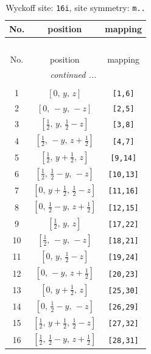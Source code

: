 \documentclass[fleqn,8pt]{jsarticle}
\begin{document}
\renewcommand{\arraystretch}{1.2}
\begin{longtable}{ccc}
\caption{Wyckoff site: {\tt 16i}, site symmetry: {\tt m..}}
 \\
 \hline \hline
No. & position & mapping \\ \hline \endfirsthead

\multicolumn{2}{l}{\tablename\ \thetable{}} \\
 \hline \hline
No. & position & mapping \\ \hline \endhead

 \hline \hline
\multicolumn{2}{r}{\footnotesize\it continued ...} \\ \endfoot

 \hline \hline
\multicolumn{2}{r}{} \\ \endlastfoot

1 & $\left[ 0,\, y,\, z \right]$ & {\tt [1,6]} \\ \hline
2 & $\left[ 0,\, - y,\, - z \right]$ & {\tt [2,5]} \\ \hline
3 & $\left[ \frac{1}{2},\, y,\, \frac{1}{2} - z \right]$ & {\tt [3,8]} \\ \hline
4 & $\left[ \frac{1}{2},\, - y,\, z + \frac{1}{2} \right]$ & {\tt [4,7]} \\ \hline
5 & $\left[ \frac{1}{2},\, y + \frac{1}{2},\, z \right]$ & {\tt [9,14]} \\ \hline
6 & $\left[ \frac{1}{2},\, \frac{1}{2} - y,\, - z \right]$ & {\tt [10,13]} \\ \hline
7 & $\left[ 0,\, y + \frac{1}{2},\, \frac{1}{2} - z \right]$ & {\tt [11,16]} \\ \hline
8 & $\left[ 0,\, \frac{1}{2} - y,\, z + \frac{1}{2} \right]$ & {\tt [12,15]} \\ \hline
9 & $\left[ \frac{1}{2},\, y,\, z \right]$ & {\tt [17,22]} \\ \hline
10 & $\left[ \frac{1}{2},\, - y,\, - z \right]$ & {\tt [18,21]} \\ \hline
11 & $\left[ 0,\, y,\, \frac{1}{2} - z \right]$ & {\tt [19,24]} \\ \hline
12 & $\left[ 0,\, - y,\, z + \frac{1}{2} \right]$ & {\tt [20,23]} \\ \hline
13 & $\left[ 0,\, y + \frac{1}{2},\, z \right]$ & {\tt [25,30]} \\ \hline
14 & $\left[ 0,\, \frac{1}{2} - y,\, - z \right]$ & {\tt [26,29]} \\ \hline
15 & $\left[ \frac{1}{2},\, y + \frac{1}{2},\, \frac{1}{2} - z \right]$ & {\tt [27,32]} \\ \hline
16 & $\left[ \frac{1}{2},\, \frac{1}{2} - y,\, z + \frac{1}{2} \right]$ & {\tt [28,31]} \\
\end{longtable}
\end{document}
